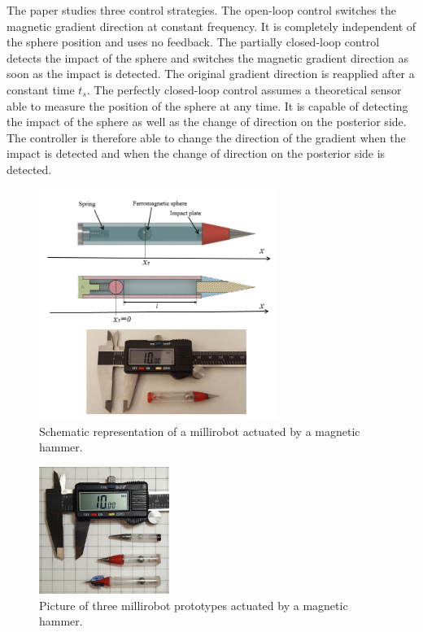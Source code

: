 \documentclass[letterpaper, 10 pt, conference]{ieeeconf}  %
\begin{document}
The paper studies three control strategies. The open-loop control switches the magnetic gradient direction at constant frequency. It is completely independent of the sphere position and uses no feedback. The partially closed-loop control detects the impact of the sphere and switches the magnetic gradient direction as soon as the impact is detected. The original gradient direction is reapplied after a constant time $t_s$. The perfectly closed-loop control assumes a theoretical sensor able to measure the position of the sphere at any time. It is capable of detecting the impact of the sphere as well as the change of direction on the posterior side. The controller is therefore able to change the direction of the gradient when the impact is detected and when the change of direction on the posterior side is detected.\par


\begin{figure}\centering
  \includegraphics[width=220pt]{figure1-2.png}
  \caption{Schematic representation of a millirobot actuated by a magnetic hammer.}
  \label{millirobot}
  \vspace{-2em}
\end{figure}

\begin{figure}
\begin{centering}
  \includegraphics[width=120pt]{robots_prototypes.jpg}
  \caption{Picture of three millirobot prototypes actuated by a magnetic hammer.}
  \label{prototypes}
\end{centering}
\end{figure}
\end{document}
